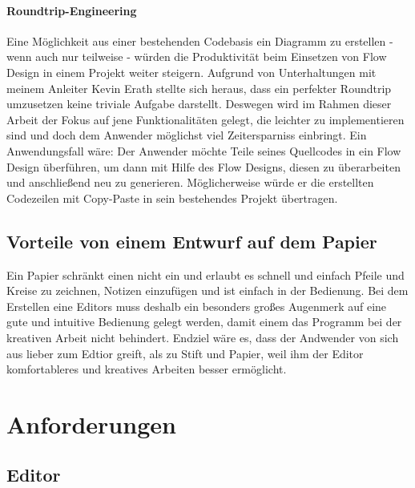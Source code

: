 \documentclass[a4paper,12pt,oneside]{book}
\begin{document}
\subsubsection{Roundtrip-Engineering}
\label{sec:orgheadline5}
Eine Möglichkeit aus einer bestehenden Codebasis ein Diagramm zu erstellen -
wenn auch nur teilweise - würden die Produktivität beim Einsetzen von Flow
Design in einem Projekt weiter steigern. Aufgrund von Unterhaltungen mit meinem
Anleiter Kevin Erath stellte sich heraus, dass ein perfekter Roundtrip umzusetzen keine triviale Aufgabe
darstellt. Deswegen wird im Rahmen dieser Arbeit der Fokus auf jene Funktionalitäten
gelegt, die leichter zu implementieren sind und doch dem Anwender möglichst viel
Zeitersparniss einbringt. Ein Anwendungsfall wäre: Der Anwender möchte
Teile seines Quellcodes in ein Flow Design überführen, um dann mit Hilfe des
Flow Designs, diesen zu überarbeiten und anschließend neu zu generieren.
Möglicherweise würde er die erstellten Codezeilen mit Copy-Paste in sein
bestehendes Projekt übertragen.

\section{Vorteile von einem Entwurf auf dem Papier}
\label{sec:orgheadline7}
Ein Papier schränkt einen nicht ein und erlaubt es schnell und einfach Pfeile
und Kreise zu zeichnen, Notizen einzufügen und ist einfach in der Bedienung.
Bei dem Erstellen eine Editors muss deshalb ein besonders großes Augenmerk auf
eine gute und intuitive Bedienung gelegt werden, damit einem das Programm bei der kreativen Arbeit nicht
behindert. Endziel wäre es, dass der Andwender von sich aus lieber zum Edtior
greift, als zu Stift und Papier, weil ihm der Editor komfortableres und
kreatives Arbeiten besser ermöglicht.

\chapter{Anforderungen}
\label{sec:orgheadline21}
\section{Editor}
\end{document}

